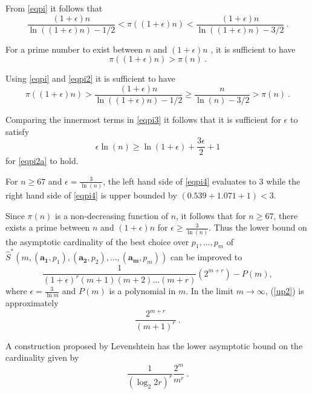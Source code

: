 From \eqref{eqpi} it follows that
\begin{equation}\label{eqpi2}
\frac{(1+\epsilon)n}{\ln((1+\epsilon)n)-1/2} < \pi((1+\epsilon)n) <
\frac{(1+\epsilon)n}{\ln((1+\epsilon)n)-3/2}~.\end{equation}

For a prime number to exist between $n$ and $(1+\epsilon)n$ , it is
sufficient to have
\begin{equation}\label{eqpi2a} \pi((1+\epsilon)n) > \pi(n)~.
\end{equation}

Using \eqref{eqpi} and \eqref{eqpi2} it is sufficient to have
\begin{equation}\label{eqpi3}\pi((1+\epsilon)n) > \frac{(1+\epsilon)n}{\ln((1+\epsilon)n)-1/2} \geq  \frac{n}{\ln(n)-3/2} > \pi(n)~.
\end{equation}

Comparing the innermost terms in \eqref{eqpi3} it follows that it is
sufficient for $\epsilon$ to satisfy
\begin{equation}\label{eqpi4}
\epsilon \ln(n) \geq \ln(1+\epsilon)+\frac{3\epsilon}{2}+1
\end{equation}
for \eqref{eqpi2a} to hold.

For $n \geq 67$ and $\epsilon = \frac{3}{\ln(n)}$, the left hand
side of \eqref{eqpi4} evaluates to $3$ while the right hand side of
\eqref{eqpi4} is upper bounded by $(0.539+1.071+1) < 3$.

Since $\pi(n)$ is a non-decreasing function of $n$, it follows that
for $n \geq 67$, there exists a prime between $n$ and
$(1+\epsilon)n$ for $\epsilon \geq \frac{3}{\ln(n)}$. Thus the lower
bound on the asymptotic cardinality of the best choice over $p_1,
\ldots, p_m$ of
$\hat{S}^*\left(m,(\mathbf{a_1},p_1),(\mathbf{a_2},p_2),...,(\mathbf{a_m},p_m)\right)$
can be improved to
\begin{equation}\label{up2}\frac{1}{(1+\epsilon)^r(m+1)(m+2)\dots(m+r)}
                           \left(2^{m+r}\right)-P(m),\end{equation}
\noindent where $\epsilon = \frac{3}{\ln m}$ and $P(m)$ is a
polynomial in $m$. In the limit $m \rightarrow \infty$, (\ref{up2})
is approximately
\begin{equation}\frac{2^{m+r}}{(m+1)^r}~.\end{equation}





A construction proposed by Levenshtein \cite{lev:66a} has the lower
asymptotic bound on the cardinality given by
\begin{equation}\label{leven}
\frac{1}{(\log_2 2r)^r}\frac{2^m}{m^r}~.
\end{equation}


